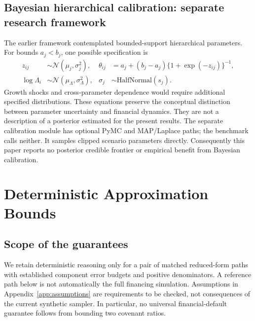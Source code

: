 \documentclass[11pt,a4paper]{article}
\theoremstyle{plain}
\theoremstyle{definition}
\begin{document}
\subsection{Bayesian hierarchical calibration: separate research framework}
The earlier framework contemplated bounded-support hierarchical parameters.
For bounds $a_j<b_j$, one possible specification is
\begin{align}
z_{ij}&\sim\mathcal N(\mu_j,\sigma_j^2),&
\theta_{ij}&=a_j+(b_j-a_j)\{1+\exp(-z_{ij})\}^{-1},\\
\log\Lambda_i&\sim\mathcal N(\mu_\Lambda,\sigma_\Lambda^2),&
\sigma_j&\sim\mathrm{HalfNormal}(s_j).
\end{align}
Growth shocks and cross-parameter dependence would require additional specified
distributions. These equations preserve the conceptual distinction between
parameter uncertainty and financial dynamics. They are not a description of a
posterior estimated for the present results. The separate calibration module has
optional PyMC and MAP/Laplace paths; the benchmark calls neither. It samples
clipped scenario parameters directly. Consequently this paper reports no
posterior credible frontier or empirical benefit from Bayesian calibration.

\section{Deterministic Approximation Bounds}
\subsection{Scope of the guarantees}
We retain deterministic reasoning only for a pair of matched reduced-form paths
with established component error budgets and positive denominators. A reference
path below is not automatically the full financing simulation. Assumptions in
Appendix~\ref{app:assumptions} are requirements to be checked, not consequences of
the current synthetic sampler. In particular, no universal financial-default
guarantee follows from bounding two covenant ratios.
\end{document}
